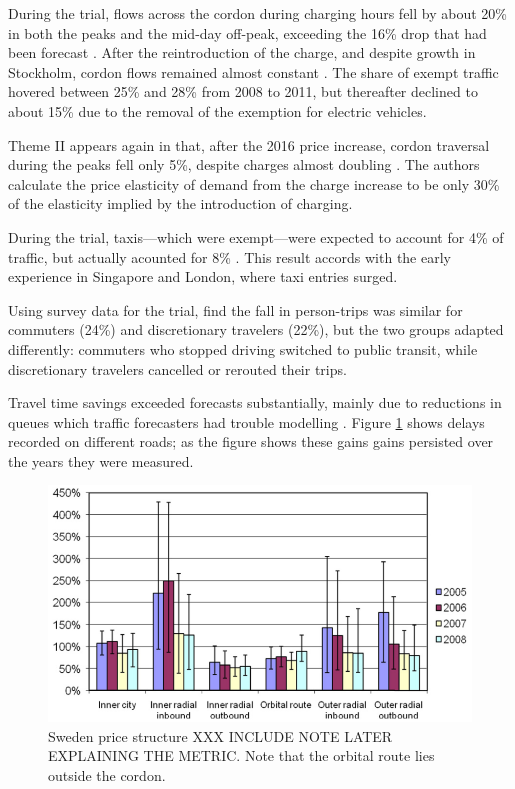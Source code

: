 During the trial, flows across the cordon during charging hours fell by about 20\% in both the peaks and the mid-day off-peak, exceeding the 16\% drop that had been forecast \citep{Eliasson2013}. After the reintroduction of the charge, and despite growth in Stockholm, cordon flows remained almost constant \citep[Tab. 4]{Borjesson2018}. The share of exempt traffic hovered between 25\% and 28\% from 2008 to 2011, but thereafter declined to about 15\% due to the removal of the exemption for electric vehicles. 

Theme II appears again in that, after the 2016 price increase, cordon traversal  during the peaks fell only 5\%, despite charges almost doubling \citep[p. 43, Tab. 6]{Borjesson2018}. The authors calculate the price elasticity of demand from the charge increase to be only 30\% of the elasticity implied by the introduction of charging.

During the trial, taxis---which were exempt---were expected to account for 4\% of traffic, but actually acounted for 8\% \citep{Eliasson2013}. This result accords with the early experience in Singapore and London, where taxi entries surged.

Using survey data for the trial, \citet{Franklin2008} find the fall in person-trips was similar for commuters (24\%) and discretionary travelers (22\%), but the two groups adapted differently: commuters who stopped driving switched to public transit, while discretionary travelers cancelled or rerouted their trips. 

Travel time savings exceeded forecasts substantially, mainly due to reductions in queues which traffic forecasters had trouble modelling \citep{Eliasson2013}. Figure \ref{fig:stockholm-travel-time} shows delays recorded on different roads; as the figure shows these gains gains persisted over the years they were measured.

\begin{figure}
    \includegraphics[width=\textwidth]{../img/stockholm-travel-times.png}
    \caption{Sweden price structure \citep{Borjesson2012} XXX INCLUDE NOTE LATER EXPLAINING THE METRIC. Note that the orbital route lies outside the cordon.}
    \label{fig:stockholm-travel-time}
\end{figure}

